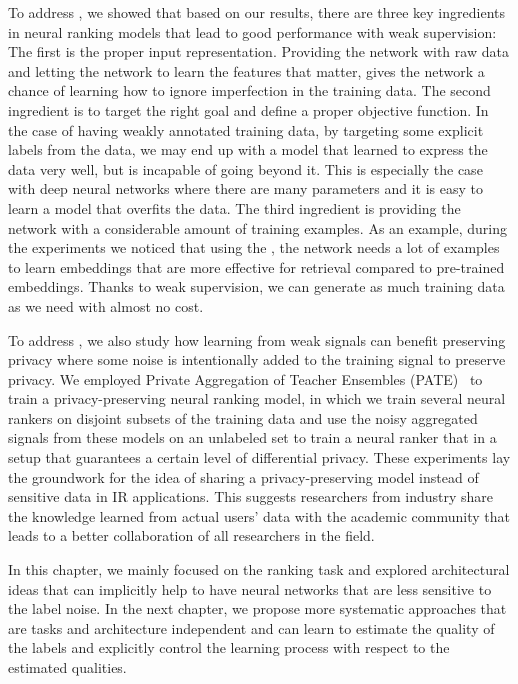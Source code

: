 To address \textbf{}, we showed that based on our results, there are three key ingredients in neural ranking models that lead to good performance with weak supervision:
%
The first is the proper input representation. Providing the network with raw data and letting the network to learn the features that matter, gives the network a chance of learning how to ignore imperfection in the training data.
%
The second ingredient is to target the right goal and define a proper objective function. In the case of having weakly annotated training data, by targeting some explicit labels from the data, we may end up with a model that learned to express the data very well, but is incapable of going beyond it. 
This is especially the case with deep neural networks where there are many parameters and it is easy to learn a model that overfits the data.
%
The third ingredient is providing the network with a considerable amount of training examples. 
As an example, during the experiments we noticed that using the \feedthree, the network needs a lot of examples to learn embeddings that are more effective for retrieval compared to pre-trained embeddings. 
Thanks to weak supervision, we can generate as much training data as we need with almost no cost.

To address \textbf{}, we also study how learning from weak signals can benefit preserving privacy where some noise is intentionally added to the training signal to preserve privacy. We employed Private Aggregation of Teacher Ensembles (PATE)~\citep{Papernot:2017}  to train a privacy-preserving neural ranking model, in which we train several neural rankers on disjoint subsets of the training data and use the noisy aggregated signals from these models on an unlabeled set to train a neural ranker that in a setup that guarantees a certain level of differential privacy.
These experiments lay the groundwork for the idea of sharing a privacy-preserving model instead of sensitive data in IR applications. This suggests researchers from industry share the knowledge learned from actual users' data with the academic community that leads to a better collaboration of all researchers in the field. 

In this chapter, we mainly focused on the ranking task and explored architectural ideas that can implicitly help to have neural networks that are less sensitive to the label noise.  
In the next chapter, we propose more systematic approaches that are tasks and architecture independent and can learn to estimate the quality of the labels and explicitly control the learning process with respect to the estimated qualities.